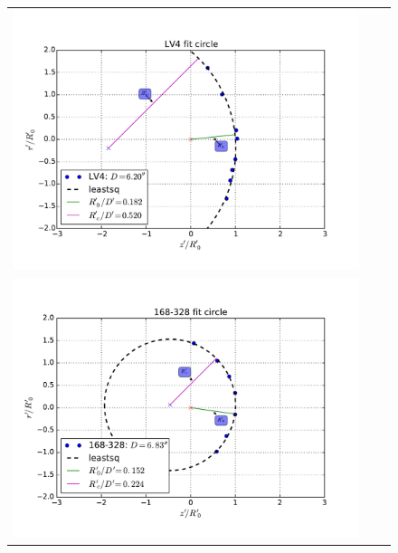 \begin{figure}
\begin{tabular}{@{}c@{}c@{}c@{}}
  \includegraphics[clip]{../../read-shapes/Multi-Fit/samp01/LV-bowshocks-xyfancy-positionssamp01-LV4} \\
  \includegraphics[clip]{../../read-shapes/LV-bowshocks-xyfancy-positionswill-168-328} & 

\end{tabular}
\end{figure}
